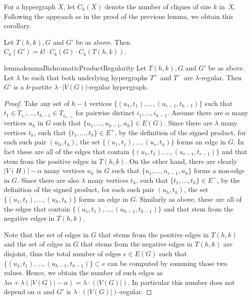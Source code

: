 \documentclass[a4paper,UKenglish,cleveref, autoref, thm-restate,numberwithinsect]{lipics-v2021}
\newcommand{\reg}{\lambda}
\begin{document}
For a hypergraph $X$, let $C_k(X)$ denote the number of cliques of size $k$ in~$X$. 
Following the approach as in the proof of the previous lemma, we obtain this corollary.
\begin{corollary}
    Let $T(h,k), G$ and $G'$ be as above. Then $C_k(G') = k!\cdot C_k(G)\cdot C_k(T(h,k))$.
\end{corollary}
\begin{restatable}{lemma}{lemmaBichromaticProductRegularity}\label{lemma:regularity-of-bichromatic-product}
    Let $T(h,k), G$ and $G'$ be as above. Let $\reg$ be such that both underlying hypergraphs $T^+$ and $T^-$ are $\reg$-regular. Then $G'$ is a $k$-partite $\reg\cdot|V(G)|$-regular hypergraph.
\end{restatable}
\begin{proof}
    Take any set of $h-1$ vertices $\{(u_1,t_1),\dots, (u_{r-1}, t_{h-1})\}$ such that $t_1\in T_{i_1},\dots, t_{h-1}\in T_{i_{h-1}}$ for pairwise distinct $i_1,\dots, i_{h-1}$.
    Assume there are $\alpha$ many vertices $u_h$ in $G$ such that $\{u_1,\dots, u_{h-1}, u_h\}\in E(G)$.
    Since there are $\reg$ many vertices $t_h$, such that $\{t_1,\dots, t_{h}\}\in E^+$, by the definition of the signed product, for each such pair $(u_h, t_h)$, the set  $\{(u_1,t_1),\dots, (u_{r}, t_{h})\}$ forms an edge in $G$. In fact these are all of the edges that contain $\{(u_1,t_1),\dots, (u_{r-1}, t_{r-1})\}$ and that stem from the positive edges in $T(h,k)$.
    On the other hand, there are clearly $|V(H)| - \alpha$ many vertices $u_h$ in $G$ such that $\{u_1,\dots, u_{r-1}, u_h\}$ forms a non-edge in $G$. 
    Since there are also $\reg$ many vertices $t_h$, such that $\{t_1,\dots, t_{h}\}\in E^-$, by the definition of the signed product, for each such pair $(u_h, t_h)$, the set  $\{(u_1,t_1),\dots, (u_{h}, t_{h})\}$ forms an edge in $G$. Similarly as above, these are all of the edges that contain $\{(u_1,t_1),\dots, (u_{h-1}, t_{h-1})\}$ and that stem from the negative edges in $T(h,k)$.
    
    Note that the set of edges in $G$ that stems from the positive edges in $T(h,k)$ and the set of edges in $G$ that stems from the negative edges in $T(h,k)$ are disjoint, thus the total number of edges $e\in E(G)$ such that $\{(u_1,t_1),\dots, (u_{h-1}, t_{h-1})\}\subset e$ can be computed by summing those two values.
    Hence, we obtain the number of such edges as $\reg\alpha + \reg(|V(G)|-\alpha) = \reg\cdot(|V(G)|)$. In particular this number does not depend on $\alpha$ and $G'$ is $\reg\cdot(|V(G)|)$-regular.
\end{proof}
\end{document}
